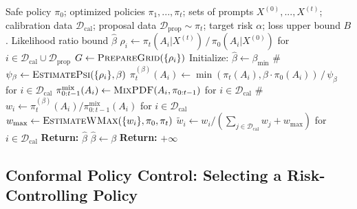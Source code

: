 \begin{algorithm}[!t]
    \caption{Pseudo-code for $\beta$ calibration.}
    \label{alg:calibrate_beta}
    \begin{algorithmic}
        \REQUIRE Safe policy $\pi_0$; optimized policies $\pi_1, ..., \pi_t$; sets of prompts $X^{(0)}, ..., X^{(t)}$; calibration data $\mathcal{D}_{\text{cal}}$; proposal data $\mathcal{D}_{\text{prop}} \sim \pi_t$; target risk $\alpha$; loss upper bound $B$.
        \ENSURE Likelihood ratio bound $\hat{\beta}$
        \STATE $\rho_i \gets \pi_t(A_i | X^{(t)}) \,/\, \pi_0(A_i | X^{(0)})$ for $i \in \mathcal{D}_{\text{cal}} \cup \mathcal{D}_{\text{prop}}$
        \STATE $G \gets \textsc{PrepareGrid}(\{\rho_i\})$
        \STATE Initialize: $\hat{\beta} \gets \beta_{\min}$
            \STATE \# 
            \STATE $\psi_\beta \gets \textsc{EstimatePsi}(\{\rho_i\}, \beta)$ 
            \STATE $\pi_t^{(\beta)}(A_i) \gets \min(\pi_t(A_i), \beta\cdot \pi_0(A_i)) \,/\, \psi_\beta$ for $i \in \mathcal{D}_{\text{cal}}$
            \STATE $\pi_{0:t-1}^{\text{mix}}(A_i) \gets \textsc{MixPDF}(A_i, \pi_{0:t-1})$ for $i \in \mathcal{D}_{\text{cal}}$
            \STATE
            \STATE \# 
            \STATE $w_i \gets \pi_t^{(\beta)}(A_i) / \pi_{0:t-1}^{\text{mix}}(A_i)$ for $i \in \mathcal{D}_{\text{cal}}$
            \STATE $w_{\max} \gets \textsc{EstimateWMax}(\{w_i\}, \pi_0, \pi_t)$
            \STATE $\tilde{w}_i \gets w_i/(\sum_{j \in \mathcal{D}_{\text{cal}}} w_j + w_{\max})$ for $i\in \mathcal{D}_{\text{cal}}$
                \STATE \textbf{Return:} $\hat{\beta}$
            \ENDIF
            \STATE $\hat{\beta} \gets \beta$
        \ENDFOR
        \STATE \textbf{Return:} $+\infty$
    \end{algorithmic}
\end{algorithm}


\subsection{Conformal Policy Control: Selecting a Risk-Controlling Policy}
\label{subsec:cpc_selecting_rc_policy}


